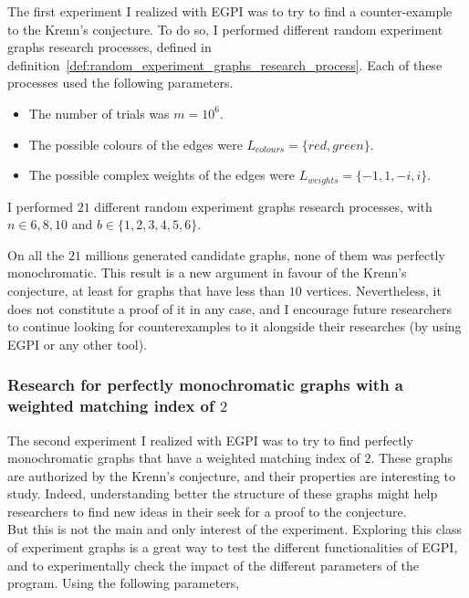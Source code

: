 The first experiment I realized with EGPI was to try to find a counter-example to the Krenn's conjecture.
To do so, I performed different random experiment graphs research processes, defined in definition~\ref{def:random_experiment_graphs_research_process}.
Each of these processes used the following parameters.

\begin{itemize}
    \item The number of trials was $m = 10^6$.
    \item The possible colours of the edges were $L_{colours} = \{red, green\}$.
    \item The possible complex weights of the edges were $L_{weights} = \{-1, 1, -i, i\}$.
\end{itemize}

I performed $21$ different random experiment graphs research processes, with $n \in {6, 8, 10}$ and $b \in \{1, 2, 3, 4, 5, 6\}$.

On all the $21$ millions generated candidate graphs, none of them was perfectly monochromatic.
This result is a new argument in favour of the Krenn's conjecture, at least for graphs that have less than $10$ vertices.
Nevertheless, it does not constitute a proof of it in any case, and I encourage future researchers to continue looking for counterexamples to it alongside their researches (by using EGPI or any other tool). \\


\subsubsection{Research for perfectly monochromatic graphs with a weighted matching index of $2$}

The second experiment I realized with EGPI was to try to find perfectly monochromatic graphs that have a weighted matching index of $2$.
These graphs are authorized by the Krenn's conjecture, and their properties are interesting to study.
Indeed, understanding better the structure of these graphs might help researchers to find new ideas in their seek for a proof to the conjecture.\\

But this is not the main and only interest of the experiment.
Exploring this class of experiment graphs is a great way to test the different functionalities of EGPI, and to experimentally check the impact of the different parameters of the program.
Using the following parameters,

